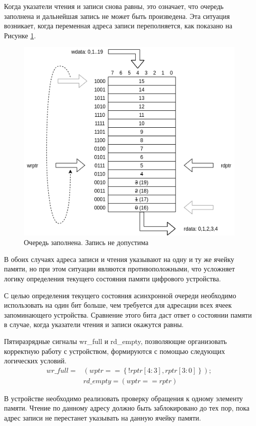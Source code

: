 Когда указатели чтения и записи снова равны, это означает, что очередь заполнена и дальнейшая запись не может быть произведена. Эта ситуация возникает, когда переменная адреса записи переполняется, как показано на Рисунке \ref{fig:full-fifo}.

\begin{figure}[h!]
	\centering
	\includegraphics[width=0.7\linewidth]{course-scheme/images/full-fifo}
	\caption{Очередь заполнена. Запись не допустима}
	\label{fig:full-fifo}
\end{figure}

В обоих случаях адреса записи и чтения указывают на одну и ту же ячейку памяти, но при этом ситуации являются противоположными, что усложняет логику определения текущего состояния памяти цифрового устройства.

С целью определения текущего состояния асинхронной очереди необходимо использовать на один бит больше, чем требуется для адресации всех ячеек запоминающего устройства. Сравнение этого бита даст ответ о состоянии памяти в случае, когда указатели чтения и записи окажутся равны.

Пятиразрядные сигналы wr\_full и rd\_empty, позволяющие организовать корректную работу с устройством, формируются с помощью следующих логических условий.
\begin{align}
	 wr\_full = &\left(wptr  == \left\{!rptr[4:3],rptr[3:0]\right\}\right);\\
	 &rd\_empty = \left(wptr  == rptr\right)
\end{align}

В устройстве необходимо реализовать проверку обращения к одному элементу памяти. Чтение по данному адресу должно быть заблокировано до тех пор, пока адрес записи не перестанет указывать на данную ячейку памяти.

